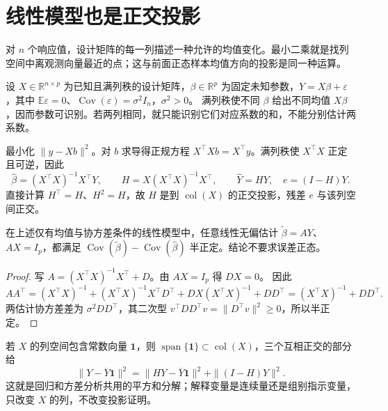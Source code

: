 \section{线性模型也是正交投影}

对 \(n\) 个响应值，设计矩阵的每一列描述一种允许的均值变化。最小二乘就是找列空间中离观测向量最近的点；这与前面正态样本均值方向的投影是同一种运算。

\begin{definition}[线性模型与可识别性]
设 \(X\in\mathbb R^{n\times p}\) 为已知且满列秩的设计矩阵，\(\beta\in\mathbb R^p\) 为固定未知参数，\(Y=X\beta+\varepsilon\)，其中
\(\mathbb E\varepsilon=0\)、\(\operatorname{Cov}(\varepsilon)=\sigma^2I_n\)，\(\sigma^2>0\)。
满列秩使不同 \(\beta\) 给出不同均值 \(X\beta\)，因而参数可识别。若两列相同，就只能识别它们对应系数的和，不能分别估计两系数。
\end{definition}

最小化 \(\|y-Xb\|^2\)。对 \(b\) 求导得正规方程
\(X^\top Xb=X^\top y\)。满列秩使 \(X^\top X\) 正定且可逆，因此
\[
\widehat\beta=(X^\top X)^{-1}X^\top Y,\qquad
H=X(X^\top X)^{-1}X^\top,\qquad
\widehat Y=HY,\quad e=(I-H)Y.
\]
直接计算 \(H^\top=H\)、\(H^2=H\)，故 \(H\) 是到
\(\operatorname{col}(X)\) 的正交投影，残差 \(e\) 与该列空间正交。

\begin{theorem}
在上述仅有均值与协方差条件的线性模型中，任意线性无偏估计
\(\widetilde\beta=AY\)、\(AX=I_p\)，都满足
\(\operatorname{Cov}(\widetilde\beta)-\operatorname{Cov}(\widehat\beta)\) 半正定。结论不要求误差正态。
\end{theorem}
\begin{proof}
写 \(A=(X^\top X)^{-1}X^\top+D\)。由 \(AX=I_p\) 得 \(DX=0\)。
因此
\[
AA^\top=(X^\top X)^{-1}
 +(X^\top X)^{-1}X^\top D^\top
 +DX(X^\top X)^{-1}+DD^\top
 =(X^\top X)^{-1}+DD^\top .
\]
两估计协方差差为 \(\sigma^2DD^\top\)，其二次型
\(v^\top DD^\top v=\|D^\top v\|^2\ge0\)，所以半正定。
\end{proof}

若 \(X\) 的列空间包含常数向量 \(\mathbf1\)，则
\(\operatorname{span}\{\mathbf1\}\subset\operatorname{col}(X)\)，三个互相正交的部分给
\[
\|Y-\overline Y\mathbf1\|^2
=\|HY-\overline Y\mathbf1\|^2+\|(I-H)Y\|^2.
\]
这就是回归和方差分析共用的平方和分解；解释变量是连续量还是组别指示变量，只改变 \(X\) 的列，不改变投影证明。

